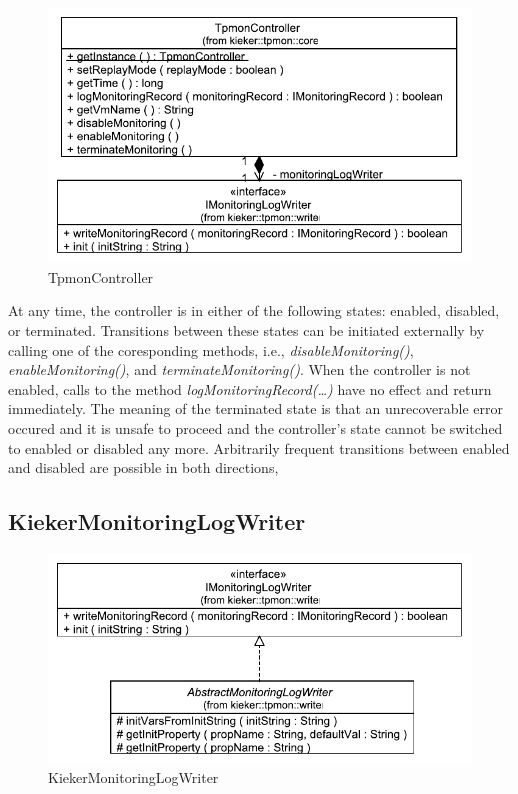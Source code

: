 \documentclass[12pt,journal,a4paper,twocolumn,final,oneside]{IEEEtran}%
\begin{document}
\begin{figure}[h]\centering
\includegraphics[scale=0.65]{figures/model/kieker_TpmonController}%
\caption{TpmonController}
\end{figure}

At any time, the controller is in either of the following states: %
enabled, disabled, or terminated. Transitions between these states can be %
initiated externally by calling one of the coresponding methods, i.e., %
\textit{disableMonitoring()}, \textit{enableMonitoring()}, and %
\textit{terminateMonitoring()}. When the controller is not enabled, calls to %
the method \textit{logMonitoringRecord(\dots)} have no effect and return %
immediately. The meaning of the terminated state is that an unrecoverable error %
occured and it is unsafe to proceed and the controller's state cannot be switched %
to enabled or disabled any more. Arbitrarily frequent transitions between enabled %
and disabled are possible in both directions, 

\subsection{KiekerMonitoringLogWriter}

\begin{figure}[h]\centering
\includegraphics[scale=0.65]{figures/model/kieker_KiekerMonitoringLogWriter}%
\caption{KiekerMonitoringLogWriter}
\end{figure}
\end{document}
